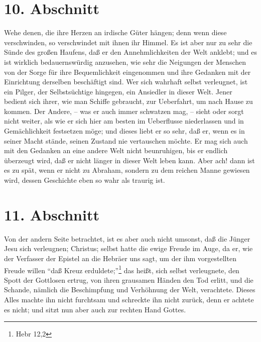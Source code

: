 \section{10. Abschnitt} \label{kap4_ab10}

Wehe denen, die ihre Herzen an irdische Güter hängen; denn wenn diese
verschwinden, so verschwindet mit ihnen ihr Himmel. Es ist aber nur zu sehr die
Sünde des großen Haufens, daß er den Annehmlichkeiten der Welt anklebt; und es
ist wirklich bedauernswürdig anzusehen, wie sehr die Neigungen der Menschen von
der Sorge für ihre Bequemlichkeit eingenommen und ihre Gedanken mit der
Einrichtung derselben beschäftigt sind. Wer sich wahrhaft selbst verleugnet, ist
ein Pilger, der Selbstsüchtige hingegen, ein Ansiedler in dieser Welt. Jener
bedient sich ihrer, wie man Schiffe gebraucht, zur Ueberfahrt, um nach Hause zu
kommen. Der Andere, -- was er auch immer schwatzen mag, -- sieht oder sorgt
nicht weiter, als wie er sich hier am besten im Ueberflusse niederlassen und in
Gemächlichkeit festsetzen möge; und dieses liebt er so sehr, daß er, wenn es in
seiner Macht stände, seinen Zustand nie vertauschen möchte. Er mag sich auch mit
den Gedanken an eine andere Welt nicht beunruhigen, bis er endlich überzeugt
wird, daß er nicht länger in dieser Welt leben kann. Aber ach! dann ist es zu
spät, wenn er nicht zu Abraham, sondern zu dem reichen Manne gewiesen wird,
dessen Geschichte eben so wahr als traurig ist.

\section{11. Abschnitt} \label{kap4_ab11}

Von der andern Seite betrachtet, ist es aber auch nicht umsonst, daß die Jünger
Jesu sich verleugnen; Christus; selbst hatte die ewige Freude im Auge, da er,
wie der Verfasser der Epistel an die Hebräer uns sagt, um der ihm vorgestellten
Freude willen "`daß Kreuz erduldete;"'\footnote{Hebr 12,2} das heißt, sich
selbst verleugnete, den Spott der Gottlosen ertrug, von ihren grausamen Händen
den Tod erlitt, und die Schande, nämlich die Beschimpfung und Verhöhnung der
Welt, verachtete. Dieses Alles machte ihn nicht furchtsam und schreckte ihn
nicht zurück, denn er achtete es nicht; und sitzt nun aber auch zur rechten Hand
Gottes.

\medskip

